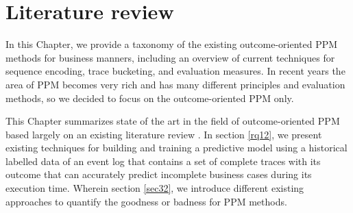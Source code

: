 
\chapter{Literature review} \label{ch3} %

In this Chapter, we provide a taxonomy of the existing outcome-oriented PPM methods for business manners, including an overview of current techniques for sequence encoding, trace bucketing, and evaluation measures. In recent years the area of PPM becomes very rich and has many different principles and evaluation methods, so we decided to focus on the outcome-oriented PPM only.

This Chapter summarizes state of the art in the field of outcome-oriented PPM based largely on an existing literature review \cite{teinemaa2019outcome}. In section \ref{rq12}, we present existing techniques for building and training a predictive model using a historical labelled data of an event log that contains a set of complete traces with its outcome that can accurately predict incomplete business cases during its execution time. Wherein section \ref{sec32}, we introduce different existing approaches to quantify the goodness or badness for PPM methods.




			


